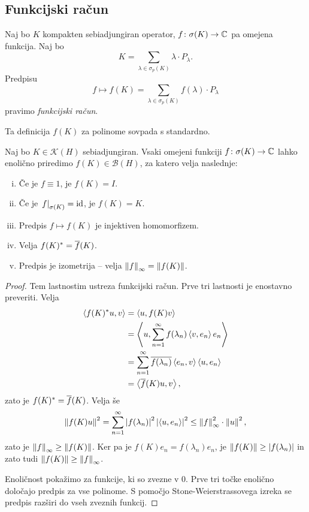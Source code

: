 \newpage

\subsection{Funkcijski račun}

\begin{definicija}
Naj bo $K$ kompakten sebiadjungiran operator,
$f \colon \sigma(K) \to \mathbb{C}$ pa omejena funkcija. Naj bo
\[
K = \sum_{\lambda \in \sigma_p(K)} \lambda \cdot P_\lambda.
\]
Predpisu
\[
f \mapsto
f(K) = \sum_{\lambda \in \sigma_p(K)} f(\lambda) \cdot P_\lambda
\]
pravimo \emph{funkcijski račun}.
\end{definicija}

\begin{opomba}
Ta definicija $f(K)$ za polinome sovpada s standardno.
\end{opomba}

\begin{izrek}
Naj bo $K \in \mathcal{K}(H)$ sebiadjungiran. Vsaki omejeni
funkciji $f \colon \sigma(K) \to \mathbb{C}$ lahko enolično priredimo
$f(K) \in \mathcal{B}(H)$, za katero velja naslednje:

\begin{enumerate}[i)]
\item Če je $f \equiv 1$, je $f(K) = I$.
\item Če je $\left. f\right|_{\sigma(K)}^{} = \operatorname{id}$, je $f(K) = K$.
\item Predpis $f \mapsto f(K)$ je injektiven homomorfizem.
\item Velja $f(K)^* = \overline{f}(K)$.
\item Predpis je izometrija -- velja
$\left\lVert f\right\rVert_\infty = \left\lVert f(K)\right\rVert$.
\end{enumerate}
\end{izrek}

\begin{proof}
Tem lastnostim ustreza funkcijski račun. Prve tri lastnosti je
enostavno preveriti. Velja
\begin{align*}
\left\langle f(K)^* u, v\right\rangle &=
\left\langle u, f(K) v\right\rangle
\\
&=
\left\langle u, \sum_{n=1}^\infty f(\lambda_n) \left\langle v, e_n\right\rangle e_n\right\rangle
\\
&=
\sum_{n=1}^\infty \overline{f(\lambda_n)} \left\langle e_n, v\right\rangle \left\langle u, e_n\right\rangle
\\
&=
\left\langle \overline{f}(K) u, v\right\rangle,
\end{align*}
zato je $f(K)^* = \overline{f}(K)$. Velja še
\[
\left\lVert f(K)u\right\rVert^2 =
\sum_{n=1}^\infty \left\lvert f(\lambda_n)\right\rvert^2 \left\lvert \left\langle u, e_n\right\rangle\right\rvert^2 \leq
\left\lVert f\right\rVert_\infty^2 \cdot \left\lVert u\right\rVert^2,
\]
zato je $\left\lVert f\right\rVert_\infty \geq \left\lVert f(K)\right\rVert$. Ker pa je
$f(K) e_n = f(\lambda_n) e_n$, je
$\left\lVert f(K)\right\rVert \geq \left\lvert f(\lambda_n)\right\rvert$ in zato tudi
$\left\lVert f(K)\right\rVert \geq \left\lVert f\right\rVert_\infty$.

Enoličnost pokažimo za funkcije, ki so zvezne v $0$. Prve tri točke
enolično določajo predpis za vse polinome. S pomočjo
Stone-Weierstrassovega izreka se predpis razširi do vseh zveznih
funkcij.
\end{proof}

